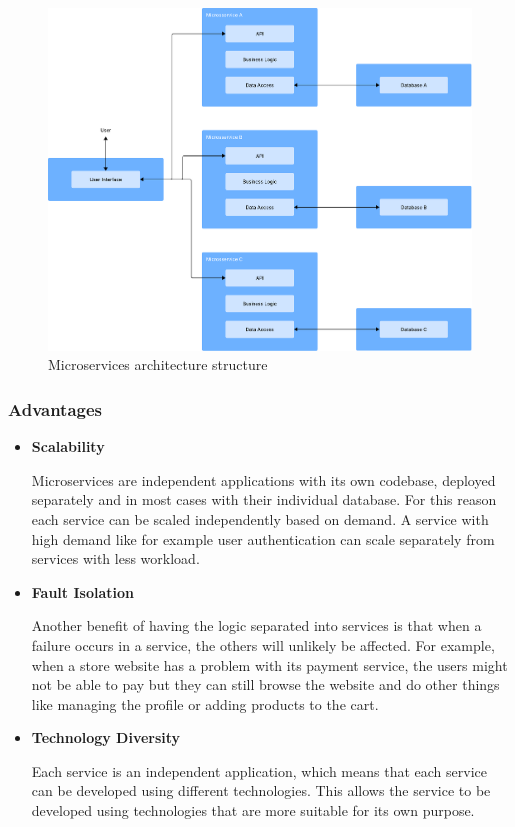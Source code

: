 \begin{figure}[htbp]
	\centering
	\includegraphics[width=\textwidth, height=0.5\textheight, keepaspectratio]{Chapters/Figures/Architectures/microservices.pdf}
	\caption{Microservices architecture structure}
	\label{fig:architectures:microservices}
\end{figure}

\subsubsection{Advantages}

\begin{itemize}
	\item \textbf{Scalability}

	      Microservices are independent applications with its own codebase, deployed
	      separately and in most cases with their individual database. For this reason
	      each service can be scaled independently based on demand. A service with
	      high demand like for example user authentication can scale separately from
	      services with less workload\cite{8990350}.

	\item \textbf{Fault Isolation}

	      Another benefit of having the logic separated into services is that when
	      a failure occurs in a service, the others will unlikely be affected. For
	      example, when a store website has a problem with its payment service, the
	      users might not be able to pay but they can still browse the website and
	      do other things like managing the profile or adding products to the cart\cite{8990350}.

	\item \textbf{Technology Diversity}

	      Each service is an independent application, which means that each service
	      can be developed using different technologies\cite{7436659}. This allows the service to
	      be developed using technologies that are more suitable for its own purpose.

\end{itemize}

